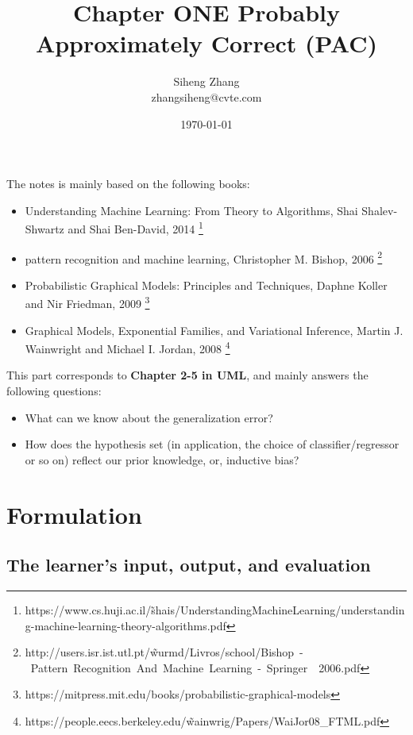 \documentclass{article}
\author{Siheng Zhang\\zhangsiheng@cvte.com}
\title{Chapter ONE Probably Approximately Correct (PAC)}
\date{\today}
\begin{document}
\maketitle  

The notes is mainly based on the following books:

\begin{itemize}
\item Understanding Machine Learning: From Theory to Algorithms, Shai Shalev-Shwartz and Shai Ben-David, 2014 \footnote{https://www.cs.huji.ac.il/\~shais/UnderstandingMachineLearning/understanding-machine-learning-theory-algorithms.pdf}

\item pattern recognition and machine learning, Christopher M. Bishop, 2006 \footnote{http://users.isr.ist.utl.pt/\~wurmd/Livros/school/Bishop\ -\ Pattern\ Recognition\ And\ Machine\ Learning\ -\ Springer\ \ 2006.pdf}

\item Probabilistic Graphical Models: Principles and Techniques, Daphne Koller and Nir Friedman, 2009 \footnote{https://mitpress.mit.edu/books/probabilistic-graphical-models}

\item Graphical Models, Exponential Families, and Variational Inference, Martin J. Wainwright and Michael I. Jordan, 2008 \footnote{https://people.eecs.berkeley.edu/\~wainwrig/Papers/WaiJor08\_FTML.pdf}
\end{itemize}

This part corresponds to \textbf{Chapter 2-5 in UML}, and mainly answers the following questions:

\begin{itemize}
\item What can we know about the generalization error?
\item How does the hypothesis set (in application, the choice of classifier/regressor or so on) reflect our prior knowledge, or, inductive bias?
\end{itemize}

\newpage

\tableofcontents
\newpage

\section{Formulation}

\subsection{The learner's input, output, and evaluation}
\end{document}
